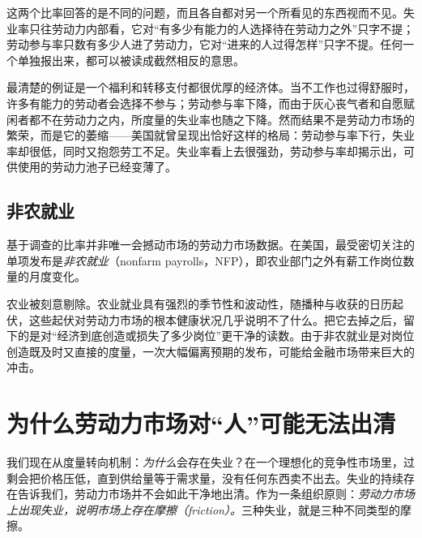 
这两个比率回答的是不同的问题，而且各自都对另一个所看见的东西视而不见。失业率只往劳动力内部看，它对“有多少有能力的人选择待在劳动力之外”只字不提；劳动参与率只数有多少人进了劳动力，它对“进来的人过得怎样”只字不提。任何一个单独报出来，都可以被读成截然相反的意思。


最清楚的例证是一个福利和转移支付都很优厚的经济体。当不工作也过得舒服时，许多有能力的劳动者会选择不参与；劳动参与率下降，而由于灰心丧气者和自愿赋闲者都不在劳动力之内，所度量的失业率也随之下降。然而结果不是劳动力市场的繁荣，而是它的萎缩——美国就曾呈现出恰好这样的格局：劳动参与率下行，失业率却很低，同时又抱怨劳工不足。失业率看上去很强劲，劳动参与率却揭示出，可供使用的劳动力池子已经变薄了。

\subsection{非农就业}

基于调查的比率并非唯一会撼动市场的劳动力市场数据。在美国，最受密切关注的单项发布是\emph{非农就业}（nonfarm payrolls，NFP），即农业部门之外有薪工作岗位数量的月度变化。


农业被刻意剔除。农业就业具有强烈的季节性和波动性，随播种与收获的日历起伏，这些起伏对劳动力市场的根本健康状况几乎说明不了什么。把它去掉之后，留下的是对“经济到底创造或损失了多少岗位”更干净的读数。由于非农就业是对岗位创造既及时又直接的度量，一次大幅偏离预期的发布，可能给金融市场带来巨大的冲击。

\section{为什么劳动力市场对“人”可能无法出清}

我们现在从度量转向机制：\emph{为什么}会存在失业？在一个理想化的竞争性市场里，过剩会把价格压低，直到供给量等于需求量，没有任何东西卖不出去。失业的持续存在告诉我们，劳动力市场并不会如此干净地出清。作为一条组织原则：\emph{劳动力市场上出现失业，说明市场上存在摩擦（friction）。}三种失业，就是三种不同类型的摩擦。

